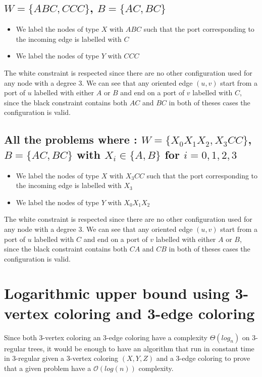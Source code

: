 \subsection[(W = (ABC, CCC), B = (AC,BC)]{$W = \{ABC, CCC\}$, $B = \{AC, BC\}$}
\begin{itemize}
    \item We label the nodes of type $X$ with $ABC$ such that the port corresponding to the incoming edge is labelled with $C$
    \item We label the nodes of type $Y$ with $CCC$
\end{itemize}
The white constraint is respected since there are no other configuration used for any node with a degree 3.
We can see that any oriented edge $(u,v)$ start from a port of $u$ labelled with either $A$ or $B$ and end on a port of $v$ labelled with $C$, since the black constraint contains both $AC$ and $BC$ in both of theses cases the configuration is valid.

\subsection[(W = (X0X1X2, X3CC), B = (AC,BC)]{All the problems where : $W = \{X_0X_1X_2, X_3CC\}$, $B = \{AC, BC\}$ with $X_i \in \{A,B\}$ for $i=0,1,2,3$}
\begin{itemize}
    \item We label the nodes of type $X$ with $X_3CC$ such that the port corresponding to the incoming edge is labelled with $X_3$
    \item We label the nodes of type $Y$ with $X_0X_1X_2$
\end{itemize}
The white constraint is respected since there are no other configuration used for any node with a degree 3.
We can see that any oriented edge $(u,v)$ start from a port of $u$ labelled with $C$ and end on a port of $v$ labelled with either $A$ or $B$, since the black constraint contains both $CA$ and $CB$ in both of theses cases the configuration is valid.

\section{Logarithmic upper bound using 3-vertex coloring and 3-edge coloring}
Since both 3-vertex coloring an 3-edge coloring have a complexity $\Theta(log_n)$ on 3-regular trees, it would be enough to have an algorithm that run in constant time in 3-regular given a 3-vertex coloring $(X,Y,Z)$ and a 3-edge coloring to prove that a given problem have a $\mathcal{O}(log(n))$ complexity.

